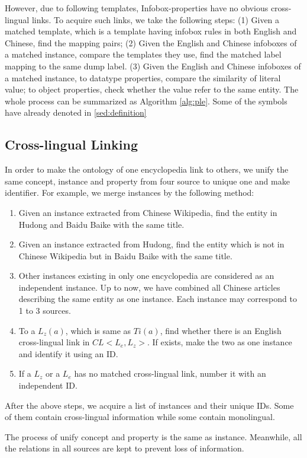 \documentclass[runningheads,a4paper]{llncs}
\begin{document}
However, due to following templates, Infobox-properties have no obvious cross-lingual links. To acquire such links, we take the following steps: (1) Given a matched template, which is a template having infobox rules in both English and Chinese, find the mapping pairs; (2) Given the English and Chinese infoboxes of a matched instance, compare the templates they use, find the matched label mapping to the same dump label. (3) Given the English and Chinese infoboxes of a matched instance, to datatype properties, compare the similarity of literal value; to object properties, check whether the value refer to the same entity. The whole process can be summarized as Algorithm \ref{alg:ple}. Some of the symbols have already denoted in \ref{sed:definition}
\subsection{Cross-lingual Linking}
In order to make the ontology of one encyclopedia link to others, we unify the same concept, instance and property from four source to unique one and make identifier. For example, we merge instances by the following method:

\begin{enumerate}[1)]
    \item Given an instance extracted from Chinese Wikipedia, find the entity in Hudong and Baidu Baike with the same title.
    \item Given an instance extracted from Hudong, find the entity which is not in Chinese Wikipedia but in Baidu Baike with the same title.
    \item Other instances existing in only one encyclopedia are considered as an independent instance. Up to now, we have combined all Chinese articles describing the same entity as one instance. Each instance may correspond to 1 to 3 sources.
    \item To a $L_{z}(a)$, which is same as $Ti(a)$, find whether there is an English cross-lingual link in $CL<L_{e}, L_{z}>$. If exists, make the two as one instance and identify it using an ID.
    \item If a $L_{z}$ or a $L_{e}$ has no matched cross-lingual link, number it with an independent ID.
\end{enumerate}

After the above steps, we acquire a list of instances and their unique IDs. Some of them contain cross-lingual information while some contain monolingual.

The process of unify concept and property is the same as instance. Meanwhile, all the relations in all sources are kept to prevent loss of information.
\end{document}
